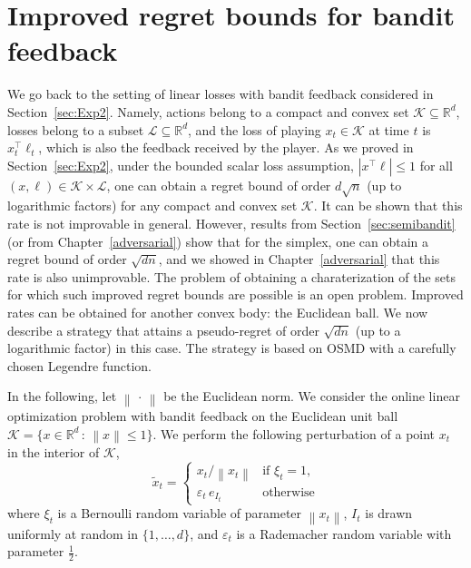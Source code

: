 \documentclass[11pt]{hackednow}
\newcommand{\R}{\mathbb{R}}
\newcommand{\cL}{\mathcal{L}}
\newcommand{\cK}{\mathcal{K}}
\renewcommand{\epsilon}{\varepsilon}
\renewcommand{\tilde}{\widetilde}
\newcommand{\norm}[1]{\left\|{#1}\right\|}
\begin{document}
\section{Improved regret bounds for bandit feedback} \label{sec:ball}
We go back to the setting of linear losses with bandit feedback considered in Section~\ref{sec:Exp2}. Namely, actions belong to a compact and convex set $\cK\subseteq\R^d$, losses belong to a subset $\cL\subseteq\R^d$, and the loss of playing $x_t\in\cK$ at time $t$ is $x_t^{\top}\ell_t$, which is also the feedback received by the player. As we proved in Section~\ref{sec:Exp2}, under the bounded scalar loss assumption, $|x^{\top}\ell| \le 1$ for all $(x,\ell)\in\cK\times\cL$, one can obtain a regret bound of order $d \sqrt{n}$ (up to logarithmic factors) for any compact and convex set $\cK$. It can be shown that this rate is not improvable in general. However, results from Section~\ref{sec:semibandit} (or from Chapter~\ref{adversarial}) show that for the simplex, one can obtain a regret bound of order $\sqrt{d n}$, and we showed in Chapter~\ref{adversarial} that this rate is also unimprovable. The problem of obtaining a charaterization of the sets for which such improved regret bounds are possible is an open problem. Improved rates can be obtained for another convex body: the Euclidean ball. We now describe a strategy that attains a pseudo-regret of order $\sqrt{d n}$ (up to a logarithmic factor) in this case. The strategy is based on OSMD with a carefully chosen Legendre function.

In the following, let $\norm{\,\cdot\,}$ be the Euclidean norm. We consider the online linear optimization problem with bandit feedback on the Euclidean unit ball $\cK = \{x \in \R^d \,:\, \norm{x} \leq 1 \}$. We perform the following perturbation of a point $x_t$ in the interior of $\cK$,
\[
    \tilde{x}_t = \left\{ \begin{array}{cl}
        x_t / \norm{x_t} & \text{if $\xi_t = 1$,}
    \\
        \epsilon_t\,e_{I_t} & \text{otherwise}
    \end{array} \right.
\]
where $\xi_t$ is a Bernoulli random variable of parameter $\norm{x_t}$, $I_t$ is drawn uniformly at random in $\{1, \hdots, d\}$, and $\epsilon_t$ is a Rademacher random variable with parameter $\frac12$.
\end{document}
